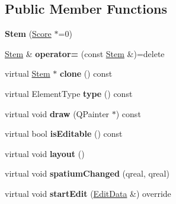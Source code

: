 \subsection*{Public Member Functions}
\begin{DoxyCompactItemize}
\item 
\mbox{\label{class_ms_1_1_stem_a1c41690086e030a9f82d5036d605ecb7}} 
{\bfseries Stem} (\hyperlink{class_ms_1_1_score}{Score} $\ast$=0)
\item 
\mbox{\label{class_ms_1_1_stem_ac09a53d9658fb7d2da8b9874c52d7986}} 
\hyperlink{class_ms_1_1_stem}{Stem} \& {\bfseries operator=} (const \hyperlink{class_ms_1_1_stem}{Stem} \&)=delete
\item 
\mbox{\label{class_ms_1_1_stem_a56e3eb2456c281cd2cea9d69fbf4f560}} 
virtual \hyperlink{class_ms_1_1_stem}{Stem} $\ast$ {\bfseries clone} () const
\item 
\mbox{\label{class_ms_1_1_stem_a91b4fe55f73dc891c37c7cf372a27ec0}} 
virtual Element\+Type {\bfseries type} () const
\item 
\mbox{\label{class_ms_1_1_stem_a3e720b3a88abb2731bb1c097039c0b71}} 
virtual void {\bfseries draw} (Q\+Painter $\ast$) const
\item 
\mbox{\label{class_ms_1_1_stem_a5b31ea02e8775c56af8aa001940b17b2}} 
virtual bool {\bfseries is\+Editable} () const
\item 
\mbox{\label{class_ms_1_1_stem_a571355dcff4862f0da33822b2dbe58d2}} 
virtual void {\bfseries layout} ()
\item 
\mbox{\label{class_ms_1_1_stem_add46484de9e7828f922a3867fe78beef}} 
virtual void {\bfseries spatium\+Changed} (qreal, qreal)
\item 
\mbox{\label{class_ms_1_1_stem_a0e6b4df953f7dfe838e17e044c578f41}} 
virtual void {\bfseries start\+Edit} (\hyperlink{class_ms_1_1_edit_data}{Edit\+Data} \&) override
\item 
\mbox{\label{class_ms_1_1_stem_a7342b35381a0783d1be29f662f6ae971}} 

\end{DoxyCompactItemize}
